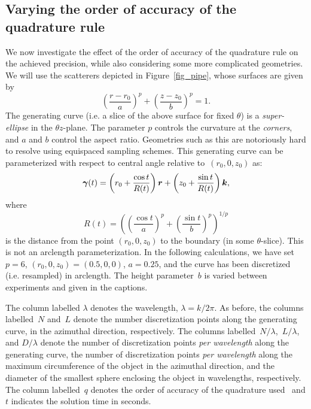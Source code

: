 \documentclass[11pt]{article}
\newcommand{\vct}{\vectorsym}
\newcommand\khat{\vct{{k}}}
\newcommand\rhat{\vct{{r}}}
\numberwithin{equation}{section}
\begin{document}
\subsection{Varying the order of accuracy of the quadrature rule}

We now investigate the effect of the order of accuracy of the quadrature rule on 
the achieved precision, while also considering some
more complicated geometries. We will use the scatterers depicted
in Figure~\ref{fig_pipe}, whose surfaces are given by
\begin{equation}
\left( \frac{r - r_0}{a} \right)^p + \left( \frac{z - z_0}{b}
\right)^p = 1 .
\end{equation}
The generating curve (i.e. a slice of the above surface for fixed
$\theta$) is a \emph{super-ellipse} in
the $\theta z$-plane. The parameter $p$ controls the curvature at the
\emph{corners}, and $a$ and $b$ control the aspect ratio. Geometries
such as this are notoriously hard to resolve using equispaced sampling
schemes. This
generating curve 
can be parameterized with respect to central angle
relative to~$(r_0,0,z_0)$ as:
\begin{equation}
\vct{\gamma}(t) = \left( 
r_0 + \frac{\cos t}{R(t)} \right) \rhat + 
\left( 
  z_0 + \frac{\sin t}{R(t)} \right) \khat,
\end{equation}
where
\begin{equation}
R(t) =  \left( \left(\frac{\cos t}{a} \right)^p
+ \left(\frac{\sin t}{b} \right)^p \right)^{1/p}
\end{equation}
is the distance from the point $(r_0,0,z_0)$ to the boundary (in some
$\theta$-slice).  This is not an arclength parameterization.
In the following calculations, we
have set~$p=6$, $(r_0,0,z_0) = (0.5,0,0)$, $a=0.25$, and the
curve has been discretized (i.e. resampled) in arclength. The height
parameter~$b$ is varied between experiments and given in the captions.

The column labelled $\lambda$ denotes the wavelength,
$\lambda = k/2\pi$.  As before, the columns labelled~$N$ and~$L$
denote the number discretization points along the generating curve, in
the azimuthal direction, respectively. The columns
labelled~$N/\lambda$,~$L/\lambda$, and $D/\lambda$ denote the number
of discretization points {\em per wavelength} along the generating curve,
the number of discretization points {\em per wavelength} along the maximum
circumference of the object in the azimuthal direction, and the
diameter of the smallest sphere enclosing the object in wavelengths,
respectively.  The column labelled~$q$ denotes the order of accuracy of the
quadrature used~\cite{alpert} and $t$ indicates the solution time in seconds.
\end{document}
